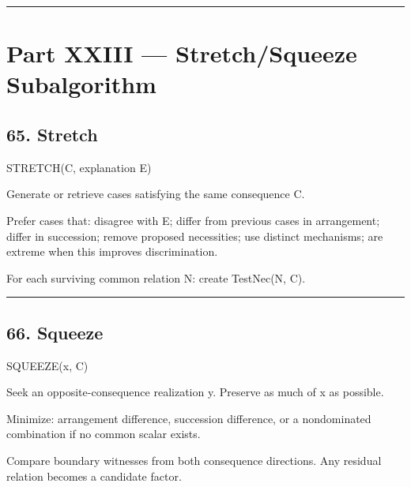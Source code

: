 \documentclass[
]{article}
\newenvironment{Shaded}{}{}
\newcommand{\NormalTok}[1]{#1}
\begin{document}
\begin{center}\rule{0.5\linewidth}{0.5pt}\end{center}

\section{Part XXIII --- Stretch/Squeeze
Subalgorithm}\label{part-xxiii-stretchsqueeze-subalgorithm}

\subsection{65. Stretch}\label{stretch}

\begin{Shaded}
\begin{Highlighting}[]
\NormalTok{STRETCH(C, explanation E)}

\NormalTok{Generate or retrieve cases satisfying the same consequence C.}

\NormalTok{Prefer cases that:}
\NormalTok{    disagree with E;}
\NormalTok{    differ from previous cases in arrangement;}
\NormalTok{    differ in succession;}
\NormalTok{    remove proposed necessities;}
\NormalTok{    use distinct mechanisms;}
\NormalTok{    are extreme when this improves discrimination.}

\NormalTok{For each surviving common relation N:}
\NormalTok{    create TestNec(N, C).}
\end{Highlighting}
\end{Shaded}

\begin{center}\rule{0.5\linewidth}{0.5pt}\end{center}

\subsection{66. Squeeze}\label{squeeze}

\begin{Shaded}
\begin{Highlighting}[]
\NormalTok{SQUEEZE(x, C)}

\NormalTok{Seek an opposite{-}consequence realization y.}
\NormalTok{Preserve as much of x as possible.}

\NormalTok{Minimize:}
\NormalTok{    arrangement difference,}
\NormalTok{    succession difference,}
\NormalTok{    or a nondominated combination if no common scalar exists.}

\NormalTok{Compare boundary witnesses from both consequence directions.}
\NormalTok{Any residual relation becomes a candidate factor.}
\end{Highlighting}
\end{Shaded}
\end{document}
